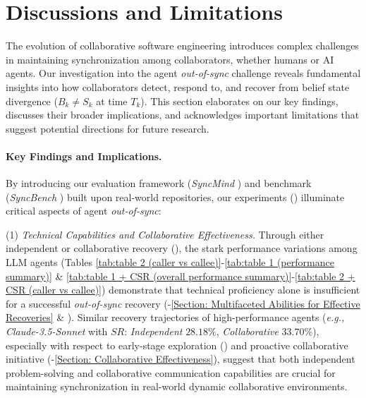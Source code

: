\appendix



\section{Discussions and Limitations}
\label{Appendix A: Discussions and Limitations}

The evolution of collaborative software engineering introduces complex challenges in maintaining synchronization among collaborators, whether humans or AI agents. Our investigation into the agent \textit{out-of-sync} challenge reveals fundamental insights into how collaborators detect, respond to, and recover from belief state divergence ($B_k \neq S_k$ at time $T_k$). This section elaborates on our key findings, discusses their broader implications, and acknowledges important limitations that suggest potential directions for future research. 

\paragraph{Key Findings and Implications.}

By introducing our evaluation framework (\textit{SyncMind} ) and benchmark (\textit{SyncBench} ) built upon real-world \github repositories, our experiments () illuminate critical aspects of agent \textit{out-of-sync}:

(1) \textit{Technical Capabilities and Collaborative Effectiveness.}
Through either independent or collaborative recovery (), the stark performance variations among LLM agents (Tables \ref{tab:table 2 (caller vs callee)}-\ref{tab:table 1 (performance summary)} \& \ref{tab:table 1 + CSR (overall performance summary)}-\ref{tab:table 2 + CSR (caller vs callee)}) demonstrate that technical proficiency alone is insufficient for a successful \textit{out-of-sync} recovery (-\ref{Section: Multifaceted Abilities for Effective Recoveries} \& ).
Similar recovery trajectories of high-performance agents (\textit{e.g.,} \textit{Claude-3.5-Sonnet} with $SR$: \textit{Independent} $28.18\%$, \textit{Collaborative} $33.70\%$), especially with respect to early-stage exploration () and proactive collaborative initiative (-\ref{Section: Collaborative Effectiveness}), suggest that both independent problem-solving and collaborative communication capabilities are crucial for maintaining synchronization in real-world dynamic collaborative environments.

